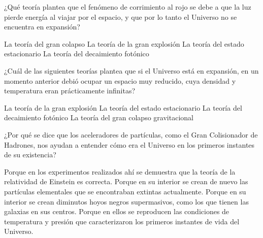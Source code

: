 \begin{parts}

    ¿Qué teoría plantea que el fenómeno de corrimiento al rojo se debe a que la luz pierde energía al viajar por el espacio, y que por lo tanto el Universo no se encuentra en expansión?
    \begin{choices}
        \choice La teoría del gran colapso
        \choice La teoría de la gran explosión
        \choice La teoría del estado estacionario
        \CorrectChoice La teoría del decaimiento fotónico
    \end{choices}
    ¿Cuál de las siguientes teorías plantea que si el Universo está en expansión, en un momento anterior debió ocupar un espacio muy reducido, cuya densidad y temperatura eran prácticamente infinitas?
    \begin{choices}
        \CorrectChoice La teoría de la gran explosión
        \choice La teoría del estado estacionario
        \choice La teoría del decaimiento fotónico
        \choice La teoría del gran colapso gravitacional
    \end{choices}
    ¿Por qué se dice que los aceleradores de partículas, como el Gran Colisionador de Hadrones, nos ayudan a entender cómo era el Universo en los primeros instantes de su existencia?
    \begin{choices}
        \choice Porque en los experimentos realizados ahí se demuestra que la teoría de la relatividad de Einstein es correcta.
        \choice Porque en su interior se crean de nuevo las partículas elementales que se encontraban extintas actualmente.
        \choice Porque en su interior se crean diminutos hoyos negros supermasivos, como los que tienen las galaxias en sus centros.
        \CorrectChoice Porque en ellos se reproducen las condiciones de temperatura y presión que caracterizaron los primeros instantes de vida del Universo.
    \end{choices}
\end{parts}